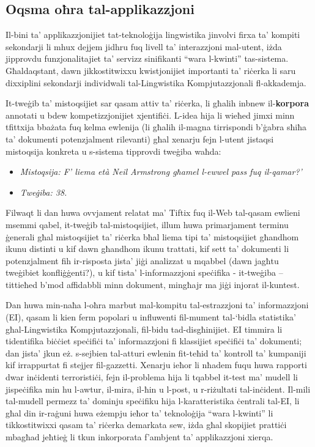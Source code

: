 \documentclass[]{../../metanetpaper}
\begin{document}
\begin{multicols}{2}
\subsection{Oqsma oħra tal-applikazzjoni}

Il-bini ta’ applikazzjonijiet tat-teknoloġija lingwistika jinvolvi firxa ta’ kompiti sekondarji li mhux dejjem jidhru fuq livell ta’ interazzjoni mal-utent, iżda jipprovdu funzjonalitajiet ta’ servizz sinifikanti ``wara l-kwinti'' tas-sistema. Għaldaqstant, dawn jikkostitwixxu kwistjonijiet importanti ta’ riċerka li saru dixxiplini sekondarji individwali tal-Lingwistika Kompjutazzjonali fl-akkademja.

It-tweġib ta’ mistoqsijiet sar qasam attiv ta’ riċerka, li għalih  inbnew il-\textbf{korpora} annotati u bdew kompetizzjonijiet xjentifiċi. L-idea hija li wieħed jimxi minn tfittxija bbażata fuq  kelma ewlenija (li għalih il-magna tirrispondi b’ġabra sħiħa ta’ dokumenti potenzjalment rilevanti) għal xenarju fejn l-utent jistaqsi mistoqsija konkreta u s-sistema tipprovdi tweġiba waħda: 

\begin{itemize}
\item[] \textit{Mistoqsija: F’ liema età Neil Armstrong għamel l-ewwel pass fuq il-qamar?'}\\
\item[] \textit{Tweġiba: 38.}
\end{itemize}

Filwaqt li dan huwa ovvjament relatat ma’ Tiftix fuq il-Web tal-qasam ewlieni msemmi qabel, it-tweġib tal-mistoqsijiet, illum huwa primarjament terminu ġenerali għal mistoqsijiet ta’ riċerka bħal liema tipi ta’ mistoqsijiet għandhom ikunu distinti u kif dawn għandhom ikunu trattati, kif sett ta’ dokumenti li potenzjalment fih ir-risposta jista’ jiġi analizzat u mqabbel (dawn jagħtu tweġibiet konfliġġenti?), u kif tista’ l-informazzjoni speċifika - it-tweġiba – tittieħed b’mod affidabbli minn dokument, mingħajr ma jiġi injorat il-kuntest.

Dan huwa min-naħa l-oħra marbut mal-kompitu tal-estrazzjoni ta’ informazzjoni (EI), qasam li kien ferm popolari u influwenti fil-mument tal-‘bidla statistika’ għal-Lingwistika Kompjutazzjonali, fil-bidu tad-disgħinijiet. EI timmira li tidentifika biċċiet speċifiċi ta’ informazzjoni fi klassijiet speċifiċi ta’ dokumenti; dan jista’ jkun eż. s-sejbien tal-atturi ewlenin fit-teħid ta’ kontroll ta’ kumpaniji kif irrappurtat fi stejjer fil-gazzetti. Xenarju ieħor li nħadem fuqu huwa rapporti dwar inċidenti terroristiċi, fejn il-problema hija li tqabbel it-test ma’ mudell li jispeċifika min hu l-awtur, il-mira, il-ħin u l-post, u r-riżultati tal-inċident. Il-mili tal-mudell permezz ta’ dominju speċifiku hija l-karatteristika ċentrali tal-EI, li għal din ir-raġuni huwa eżempju ieħor ta’ teknoloġija ``wara l-kwinti'' li tikkostitwixxi qasam ta’ riċerka demarkata sew, iżda għal skopijiet prattiċi mbagħad jeħtieġ li tkun inkorporata f’ambjent ta’ applikazzjoni xierqa.


\end{multicols}
\end{document}
